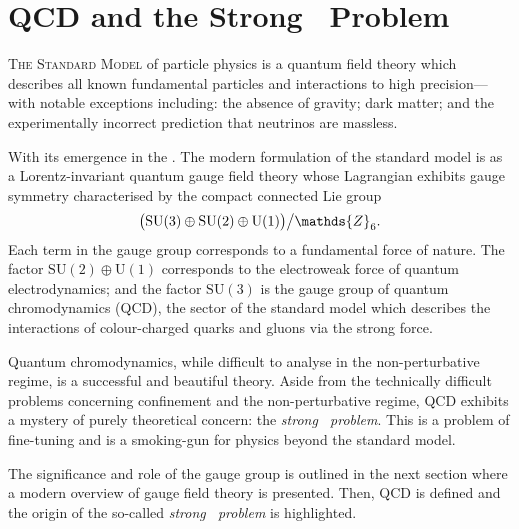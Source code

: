 \chapter{QCD and the Strong \CP\ Problem}

\textsc{The Standard Model} of particle physics is a quantum field theory which describes all known fundamental particles and interactions to high precision---with notable exceptions including:
the absence of gravity;
dark matter;
and the experimentally incorrect prediction that neutrinos are massless.

With its emergence in the .
The modern formulation of the standard model is as a Lorentz-invariant quantum gauge field theory whose Lagrangian exhibits gauge symmetry characterised by the compact connected Lie group
\begin{align}
	\qty\big(\mathrm{SU}(3)\oplus\mathrm{SU}(2)\oplus\mathrm{U}(1))\big/\mathds{Z}_6
	\label{eqn:SM-gauge-group}
.\end{align}
Each term in the gauge group corresponds to a fundamental force of nature.
The factor $\mathrm{SU}(2)\oplus\mathrm{U}(1)$ corresponds to the electroweak force of quantum electrodynamics; and the factor $\mathrm{SU}(3)$ is the gauge group of quantum chromodynamics (QCD), the sector of the standard model which describes the interactions of colour-charged quarks and gluons via the strong force.

Quantum chromodynamics, while difficult to analyse in the non-perturbative regime, is a successful and beautiful theory.
Aside from the technically difficult problems concerning confinement and the non-perturbative regime, QCD exhibits a mystery of purely theoretical concern: the \emph{strong \CP\ problem}.
This is a problem of fine-tuning and is a smoking-gun for physics beyond the standard model.



The significance and role of the gauge group is outlined in the next section where a modern overview of gauge field theory
is presented.
Then, QCD is defined and the origin of the so-called \emph{strong \CP\ problem} is highlighted.


